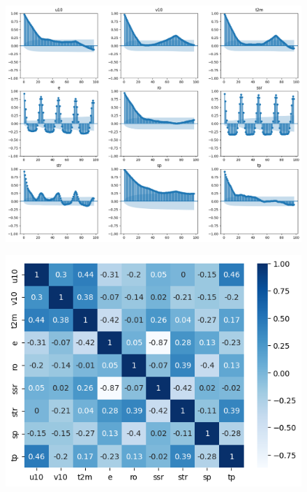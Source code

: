 \begin{figure}[H]
    \centering
    \includegraphics[width=\textwidth]{images/dt_autocorr.png}
    \caption{}
    \label{dt-autocorr}
\end{figure}

\begin{figure}[H]
    \centering
    \includegraphics[width=\textwidth]{images/svr_corr_matrix.png}
    \caption{}
    \label{svr-corr-matrix}
\end{figure}

